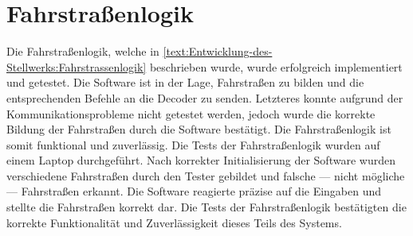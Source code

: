 \section{Fahrstraßenlogik}\label{text:Auswertung:Fahrstrassenlogik}

Die Fahrstraßenlogik, welche in \autoref{text:Entwicklung-des-Stellwerks:Fahrstrassenlogik}  beschrieben wurde, wurde erfolgreich implementiert und getestet. Die Software ist in der Lage, Fahrstraßen zu bilden und die entsprechenden Befehle an die Decoder zu senden. Letzteres konnte aufgrund der Kommunikationsprobleme nicht getestet werden, jedoch wurde die korrekte Bildung der Fahrstraßen durch die Software bestätigt. Die Fahrstraßenlogik ist somit funktional und zuverlässig.
\newline
Die Tests der Fahrstraßenlogik wurden auf einem Laptop durchgeführt. Nach korrekter Initialisierung der Software wurden verschiedene Fahrstraßen durch den Tester gebildet und falsche --- nicht mögliche --- Fahrstraßen erkannt. Die Software reagierte präzise auf die Eingaben und stellte die Fahrstraßen korrekt dar. Die Tests der Fahrstraßenlogik bestätigten die korrekte Funktionalität und Zuverlässigkeit dieses Teils des Systems.
